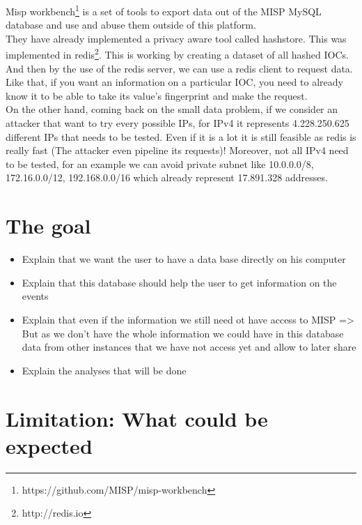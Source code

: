 \documentclass{eplmastersthesis}
\begin{document}
Misp workbench\footnote{https://github.com/MISP/misp-workbench} is a set of tools to export data out of the MISP MySQL database and use and abuse them outside of this platform.\\

They have already implemented a privacy aware tool called hashstore. This was implemented in redis\footnote{http://redis.io}. This is working by creating a dataset of all hashed IOCs. And then by the use of the redis server, we can use a redis client to request data.\\
Like that, if you want an information on a particular IOC, you need to already know it to be able to take its value's fingerprint and make the request.\\
On the other hand, coming back on the small data problem, if we consider an attacker that want to try every possible IPs, for IPv4 it represents 4.228.250.625 different IPs that needs to be tested. Even if it is a lot it is still feasible as redis is really fast (The attacker even pipeline its requests)! Moreover, not all IPv4 need to be tested, for an example we can avoid private subnet like 10.0.0.0/8, 172.16.0.0/12, 192.168.0.0/16 which already represent 17.891.328 addresses.


\section{The goal}
\begin{itemize}
\item Explain that we want the user to have a data base directly on his computer 
\item Explain that this database should help the user to get information on the events
\item Explain that even if the information we still need ot have access to MISP => But as we don't have the whole information we could have in this database data from other instances that we have not access yet and allow to later share
\item Explain the analyses that will be done
\end{itemize}

\section{Limitation: What could be expected}
\end{document}
